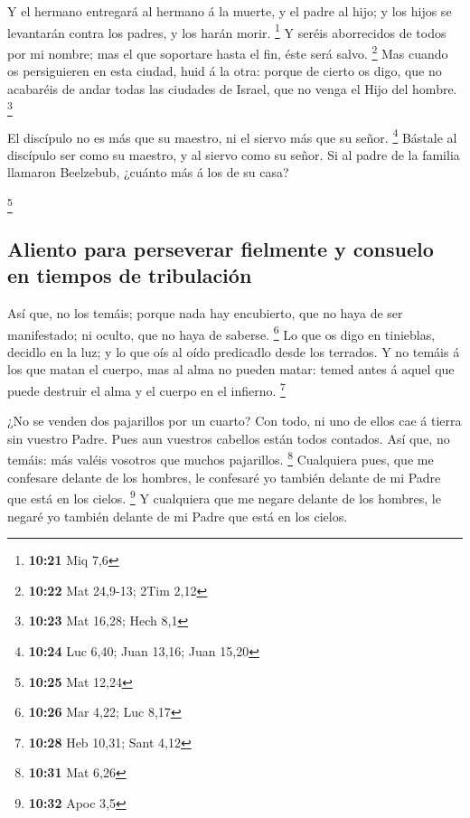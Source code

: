  Y el hermano entregará al hermano á la muerte, y el
padre al hijo; y los hijos se levantarán contra los padres, y los harán
morir. \footnote{\textbf{10:21} Miq 7,6}  Y seréis
aborrecidos de todos por mi nombre; mas el que soportare hasta el fin,
éste será salvo. \footnote{\textbf{10:22} Mat 24,9-13; 2Tim 2,12}
 Mas cuando os persiguieren en esta ciudad, huid á la
otra: porque de cierto os digo, que no acabaréis de andar todas las
ciudades de Israel, que no venga el Hijo del hombre. \footnote{\textbf{10:23}
  Mat 16,28; Hech 8,1}

 El discípulo no es más que su maestro, ni el siervo más
que su señor. \footnote{\textbf{10:24} Luc 6,40; Juan 13,16; Juan 15,20}
 Bástale al discípulo ser como su maestro, y al siervo
como su señor. Si al padre de la familia llamaron Beelzebub, ¿cuánto más
á los de su casa?

\footnote{\textbf{10:25} Mat 12,24}

\hypertarget{aliento-para-perseverar-fielmente-y-consuelo-en-tiempos-de-tribulaciuxf3n}{%
\subsection{Aliento para perseverar fielmente y consuelo en tiempos de
tribulación}\label{aliento-para-perseverar-fielmente-y-consuelo-en-tiempos-de-tribulaciuxf3n}}

 Así que, no los temáis; porque nada hay encubierto, que
no haya de ser manifestado; ni oculto, que no haya de saberse.
\footnote{\textbf{10:26} Mar 4,22; Luc 8,17}  Lo que os
digo en tinieblas, decidlo en la luz; y lo que oís al oído predicadlo
desde los terrados.  Y no temáis á los que matan el
cuerpo, mas al alma no pueden matar: temed antes á aquel que puede
destruir el alma y el cuerpo en el infierno. \footnote{\textbf{10:28}
  Heb 10,31; Sant 4,12}

 ¿No se venden dos pajarillos por un cuarto? Con todo, ni
uno de ellos cae á tierra sin vuestro Padre.  Pues aun
vuestros cabellos están todos contados.  Así que, no
temáis: más valéis vosotros que muchos pajarillos. \footnote{\textbf{10:31}
  Mat 6,26}  Cualquiera pues, que me confesare delante de
los hombres, le confesaré yo también delante de mi Padre que está en los
cielos. \footnote{\textbf{10:32} Apoc 3,5}  Y cualquiera
que me negare delante de los hombres, le negaré yo también delante de mi
Padre que está en los cielos.

